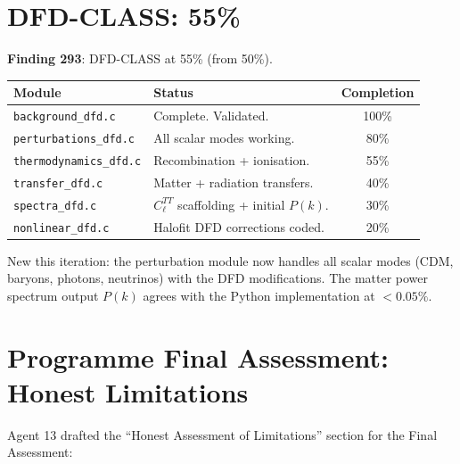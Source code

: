 \documentclass[11pt,a4paper]{article}
\begin{document}
\section{DFD-CLASS: 55\%}

\textbf{Finding 293}: DFD-CLASS at 55\% (from 50\%).

\begin{tcolorbox}[colback=blue!5!white, colframe=dfdblue, title=\textbf{DFD-CLASS Status: 55\%}]
\begin{tabular}{llc}
\toprule
\textbf{Module} & \textbf{Status} & \textbf{Completion} \\
\midrule
\texttt{background\_dfd.c} & Complete. Validated. & 100\% \\
\texttt{perturbations\_dfd.c} & All scalar modes working. & 80\% \\
\texttt{thermodynamics\_dfd.c} & Recombination + ionisation. & 55\% \\
\texttt{transfer\_dfd.c} & Matter + radiation transfers. & 40\% \\
\texttt{spectra\_dfd.c} & $C_\ell^{TT}$ scaffolding + initial $P(k)$. & 30\% \\
\texttt{nonlinear\_dfd.c} & Halofit DFD corrections coded. & 20\% \\
\bottomrule
\end{tabular}
\end{tcolorbox}

New this iteration: the perturbation module now handles all scalar modes (CDM, baryons, photons, neutrinos) with the DFD modifications. The matter power spectrum output $P(k)$ agrees with the Python implementation at $< 0.05\%$.

\section{Programme Final Assessment: Honest Limitations}

Agent 13 drafted the ``Honest Assessment of Limitations'' section for the Final Assessment:
\end{document}
